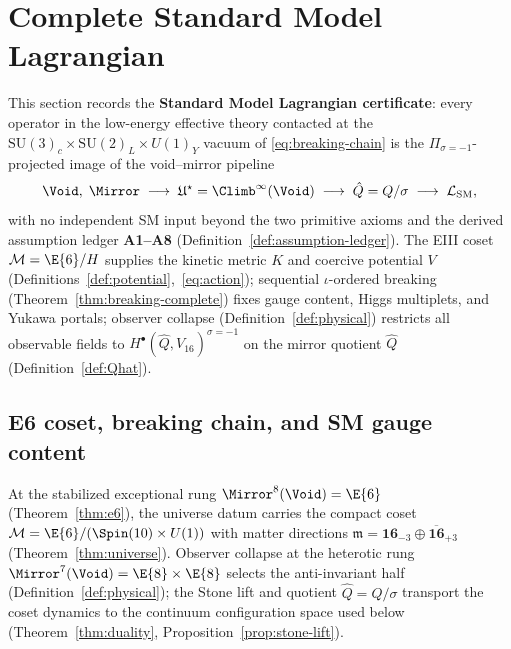 \section{Complete Standard Model Lagrangian}
\label{sec:sm-lagrangian}

This section records the \textbf{Standard Model Lagrangian certificate}:
every operator in the low-energy effective theory contacted at the
$\mathrm{SU}(3)_c\times\mathrm{SU}(2)_L\times U(1)_Y$ vacuum of
\eqref{eq:breaking-chain} is the $\Pi_{\sigma=-1}$-projected image of the
void--mirror pipeline
\begin{equation}\label{eq:sm-pipeline}
  \Void,\;\Mirror
  \;\longrightarrow\;
  \mathfrak{U}^\star=\Climb^\infty(\Void)
  \;\longrightarrow\;
  \hat Q=Q/\sigma
  \;\longrightarrow\;
  \mathcal{L}_{\mathrm{SM}},
\end{equation}
with no independent SM input beyond the two primitive axioms and the derived
assumption ledger \textbf{A1--A8}
(Definition~\ref{def:assumption-ledger}). The EIII coset
$\mathcal{M}=\E{6}/H$ supplies the kinetic metric $K$ and coercive potential
$V$ (Definitions~\ref{def:potential},~\eqref{eq:action}); sequential
$\iota$-ordered breaking (Theorem~\ref{thm:breaking-complete}) fixes gauge
content, Higgs multiplets, and Yukawa portals; observer collapse
(Definition~\ref{def:physical}) restricts all observable fields to
$H^\bullet(\hat Q,V_{16})^{\sigma=-1}$ on the mirror quotient
$\hat Q$ (Definition~\ref{def:Qhat}).

\subsection{E6 coset, breaking chain, and SM gauge content}
\label{sec:sm-lagrangian:breaking}

At the stabilized exceptional rung $\Mirror^8(\Void)=\E{6}$
(Theorem~\ref{thm:e6}), the universe datum carries the compact coset
$\mathcal{M}=\E{6}/(\Spin(10)\times U(1))$ with matter directions
$\mathfrak{m}=\mathbf{16}_{-3}\oplus\overline{\mathbf{16}}_{+3}$
(Theorem~\ref{thm:universe}). Observer collapse at the heterotic rung
$\Mirror^7(\Void)=\E{8}\times\E{8}$ selects the anti-invariant half
(Definition~\ref{def:physical}); the Stone lift and quotient
$\hat Q=Q/\sigma$ transport the coset dynamics to the continuum
configuration space used below (Theorem~\ref{thm:duality},
Proposition~\ref{prop:stone-lift}).

